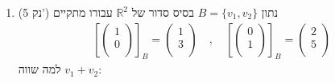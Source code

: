 \documentclass[12pt, a4paper]{article}
\newcommand{\rr}{\mathbb{R}}
\newcommand{\points}[1]{(#1 נק') }
\begin{document}
\begin{enumerate}
\item\points{5}
נתון 
$B=\{v_1,v_2\}$
בסיס סדור של
$\rr^2$
עבורו מתקיים
\begin{align*}
\left[\begin{pmatrix}
1\\0\\
\end{pmatrix}\right]_B=
\begin{pmatrix}
1\\3 \\
\end{pmatrix}\quad,\quad
\left[\begin{pmatrix}
0\\1\\
\end{pmatrix}\right]_B=
\begin{pmatrix}
2\\5 \\
\end{pmatrix}
\end{align*}
למה שווה
$v_1+v_2$:
\begin{enumerate}
\end{enumerate}



\end{enumerate}
\end{document}
